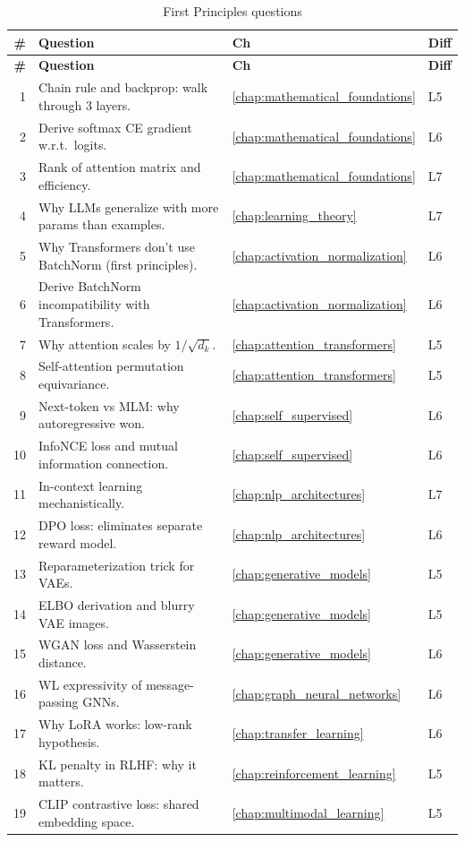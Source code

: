 \begin{longtable}{rp{8.5cm}ll}
\caption{First Principles questions} \\
\toprule
\textbf{\#} & \textbf{Question} & \textbf{Ch} & \textbf{Diff} \\
\midrule
\endfirsthead
\toprule
\textbf{\#} & \textbf{Question} & \textbf{Ch} & \textbf{Diff} \\
\midrule
\endhead
\bottomrule
\endlastfoot

1 & Chain rule and backprop: walk through 3 layers. & \ref{chap:mathematical_foundations} & L5 \\
2 & Derive softmax CE gradient w.r.t.\ logits. & \ref{chap:mathematical_foundations} & L6 \\
3 & Rank of attention matrix and efficiency. & \ref{chap:mathematical_foundations} & L7 \\
4 & Why LLMs generalize with more params than examples. & \ref{chap:learning_theory} & L7 \\
5 & Why Transformers don't use BatchNorm (first principles). & \ref{chap:activation_normalization} & L6 \\
6 & Derive BatchNorm incompatibility with Transformers. & \ref{chap:activation_normalization} & L6 \\
7 & Why attention scales by $1/\sqrt{d_k}$. & \ref{chap:attention_transformers} & L5 \\
8 & Self-attention permutation equivariance. & \ref{chap:attention_transformers} & L5 \\
9 & Next-token vs MLM: why autoregressive won. & \ref{chap:self_supervised} & L6 \\
10 & InfoNCE loss and mutual information connection. & \ref{chap:self_supervised} & L6 \\
11 & In-context learning mechanistically. & \ref{chap:nlp_architectures} & L7 \\
12 & DPO loss: eliminates separate reward model. & \ref{chap:nlp_architectures} & L6 \\
13 & Reparameterization trick for VAEs. & \ref{chap:generative_models} & L5 \\
14 & ELBO derivation and blurry VAE images. & \ref{chap:generative_models} & L5 \\
15 & WGAN loss and Wasserstein distance. & \ref{chap:generative_models} & L6 \\
16 & WL expressivity of message-passing GNNs. & \ref{chap:graph_neural_networks} & L6 \\
17 & Why LoRA works: low-rank hypothesis. & \ref{chap:transfer_learning} & L6 \\
18 & KL penalty in RLHF: why it matters. & \ref{chap:reinforcement_learning} & L5 \\
19 & CLIP contrastive loss: shared embedding space. & \ref{chap:multimodal_learning} & L5 \\
\end{longtable}

